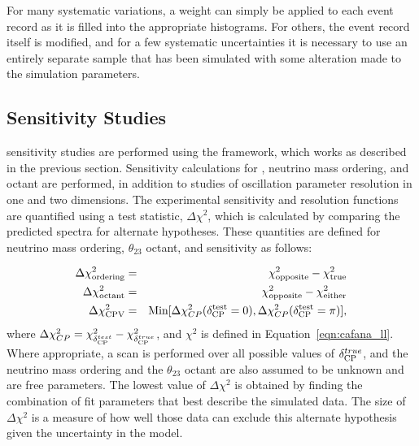 For many systematic variations, a weight can simply be applied to each event record as it is filled into the appropriate histograms. For others, the event record itself is modified, and for a few systematic uncertainties it is necessary to use an entirely separate sample that has been simulated with some alteration made to the simulation parameters. %







\subsection{ Sensitivity Studies}
\label{sect:methods-dunefits}

 sensitivity studies are performed using the  framework, which works as described in the previous section. Sensitivity calculations for , neutrino mass ordering, and octant are performed, in addition to studies of oscillation parameter resolution in one and two dimensions.
The experimental sensitivity and resolution functions are quantified using a test statistic, $\Delta\chi^2$, which is calculated by comparing the predicted spectra for alternate hypotheses. These quantities are defined for neutrino mass ordering, $\theta_{23}$ octant, and  sensitivity as follows:

\begin{eqnarray}
\Delta\chi^2_{\textrm{ordering}} & = & \chi^2_{\textrm{opposite}} - \chi^2_{\textrm{true}} \label{eq:dx2_MH}\\
\Delta\chi^2_{\textrm{octant}} & = & \chi^2_{\textrm{opposite}} - \chi^2_{\textrm{either}} \\
\Delta\chi^2_{\textrm{CPV}} & = & \textrm{Min}[\Delta\chi^2_{CP}(\delta_{\rm CP}^{\textrm{test}}=0),\Delta\chi^2_{CP}(\delta_{\rm CP}^{\textrm{test}}=\pi)],
\end{eqnarray}
where $\Delta\chi^2_{CP} = \chi^{2}_{\delta_{\rm CP}^{test}} - \chi^2_{\delta_{\rm CP}^{true}}$, and $\chi^2$ is defined in Equation~\ref{eqn:cafana_ll}. Where appropriate, a scan is performed over all possible values of $\delta_{\rm CP}^{true}$, and the neutrino mass ordering and the $\theta_{23}$ octant are also assumed to be unknown and are free parameters. The lowest value of $\Delta\chi^2$ is obtained by finding the combination of fit parameters that best describe the simulated data. The size of $\Delta\chi^2$ is a measure of how well those data can exclude this alternate hypothesis given the uncertainty in the model. 



